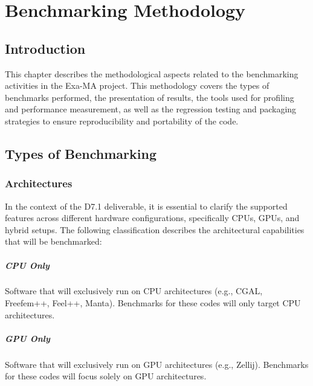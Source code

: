 
\chapter{Benchmarking Methodology}
\label{chap:methodology}

\section{Introduction}
\label{sec:methodology-intro}

This chapter describes the methodological aspects related to the benchmarking activities in the Exa-MA project. 
This methodology covers the types of benchmarks performed, the presentation of results, the tools used for profiling and performance measurement, as well as the regression testing and packaging strategies to ensure reproducibility and portability of the code.

\section{Types of Benchmarking}
\label{sec:methodology-types}

\subsection{Architectures}

In the context of the D7.1 deliverable, it is essential to clarify the supported features across different hardware configurations, specifically CPUs, GPUs, and hybrid setups. 
The following classification describes the architectural capabilities that will be benchmarked:

\paragraph{CPU Only}
Software that will exclusively run on CPU architectures (e.g., CGAL, Freefem++, Feel++, Manta). Benchmarks for these codes will only target CPU architectures.

\paragraph{GPU Only}
Software that will exclusively run on GPU architectures (e.g., Zellij). Benchmarks for these codes will focus solely on GPU architectures.

